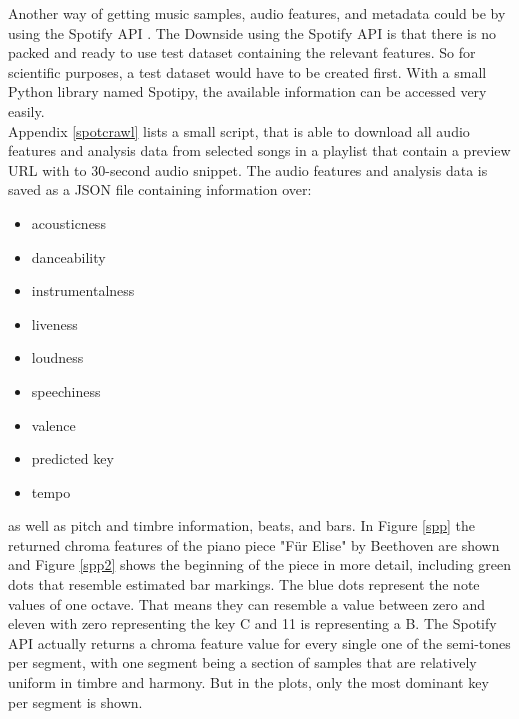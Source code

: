 Another way of getting music samples, audio features, and metadata could be by using the Spotify API \cite{spotifyapi1}.
The Downside using the Spotify API is that there is no packed and ready to use test dataset containing the relevant features. So for scientific purposes, a test dataset would have to be created first. With a small Python library named Spotipy, the available information can be accessed very easily. \cite{spotipy1}\\
Appendix \ref{spotcrawl} lists a small script, that is able to download all audio features and analysis data from selected songs in a playlist that contain a preview URL with to 30-second audio snippet. The audio features and analysis data is saved as a JSON file containing information over:
\begin{itemize}
	\setlength\itemsep{-0.5em}
	\item acousticness
	\item danceability
	\item instrumentalness
	\item liveness
	\item loudness
	\item speechiness
	\item valence
	\item predicted key
	\item tempo 
\end{itemize}
as well as pitch and timbre information, beats, and bars.
In Figure \ref{spp} the returned chroma features of the piano piece "Für Elise" by Beethoven are shown and Figure \ref{spp2} shows the beginning of the piece in more detail, including green dots that resemble estimated bar markings. The blue dots represent the note values of one octave. That means they can resemble a value between zero and eleven with zero representing the key C and 11 is representing a B. The Spotify API actually returns a chroma feature value for every single one of the semi-tones per segment, with one segment being a section of samples that are relatively uniform in timbre and harmony. But in the plots, only the most dominant key per segment is shown.
